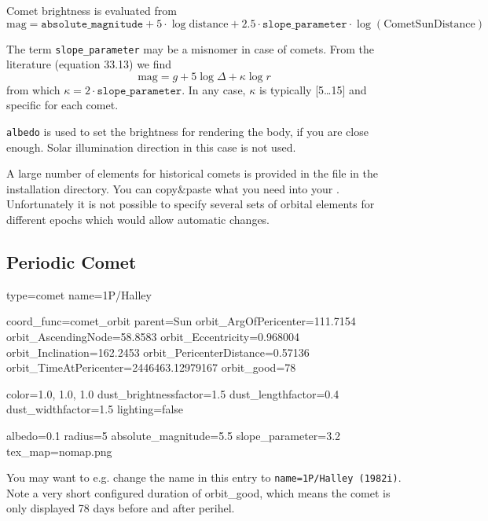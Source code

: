 Comet brightness is evaluated from
\begin{equation}
  \label{eq:comet_magnitudes}
  \mathrm{mag}=\mathtt{absolute\_magnitude}+5\cdot\log{\mathrm{distance}} + 2.5\cdot\mathtt{slope\_parameter}\cdot\log(\mathrm{CometSunDistance})
\end{equation}

The term \texttt{slope\_parameter} may be a misnomer in case of
comets. From the literature \cite{AstronomicalAlgorithms:1998} (equation 33.13) we find
\begin{equation}
  \label{eq:comet_magnitudes_Meeus}
  \mathrm{mag}=g+5\log\Delta + \kappa\log r
\end{equation}
from which $\kappa=2\cdot\mathtt{slope\_parameter}$. In any case, $\kappa$ is typically [5\ldots15] and specific for each comet.

\texttt{albedo} is used to set the brightness for rendering the body,
if you are close enough. Solar illumination direction in this case is
not used.

A large number of elements for historical comets is provided in the
file  in the installation directory. You
can copy\&paste what you need into your
. Unfortunately it is not possible to specify
several sets of orbital elements for different epochs which would
allow automatic changes.

\subsection{Periodic Comet}
\label{sec:ssystem.ini:Comet:Periodic}

\begin{configfile}
[1phalley]
type=comet  
name=1P/Halley

coord_func=comet_orbit
parent=Sun
orbit_ArgOfPericenter=111.7154
orbit_AscendingNode=58.8583
orbit_Eccentricity=0.968004
orbit_Inclination=162.2453
orbit_PericenterDistance=0.57136
orbit_TimeAtPericenter=2446463.12979167
orbit_good=78

color=1.0, 1.0, 1.0
dust_brightnessfactor=1.5
dust_lengthfactor=0.4
dust_widthfactor=1.5
lighting=false

albedo=0.1
radius=5
absolute_magnitude=5.5
slope_parameter=3.2
tex_map=nomap.png
\end{configfile}

You may want to e.g. change the name in this entry
to \texttt{name=1P/Halley (1982i)}. Note a very short configured
duration of orbit\_good, which means the comet is only displayed 78
days before and after perihel.


